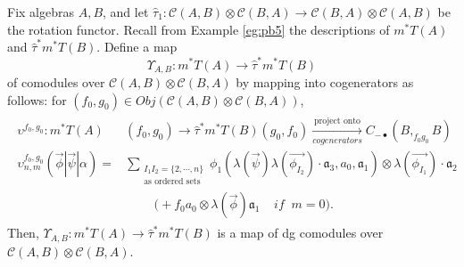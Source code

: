 \begin{prop}
\label{prop:c1}
Fix algebras $A,B$, and let 
$\hat{\tau}_1: \mathcal{C}(A,B) \otimes 
\mathcal{C}(B,A) \to \mathcal{C}(B,A) \otimes 
\mathcal{C}(A,B)$ be the rotation functor.
Recall from Example \ref{eg:pb5} 
the descriptions of $m^*T(A)$ and 
$\hat{\tau}^*m^*T(B)$. Define a map 
$$
\Upsilon_{A,B}: m^*T(A)
\to \hat{\tau}^*m^*T(B)
$$
of comodules over 
$\mathcal{C}(A,B) \otimes 
\mathcal{C}(B,A)$ by mapping into 
cogenerators as follows: for 
$(f_0,g_0) \in Obj(\mathcal{C}(A,B) \otimes 
\mathcal{C}(B,A))$,
\begin{align}\label{eq:define_upsilon}
\begin{split}
\upsilon^{f_0, g_0}: 
m^*T(A)
&(f_0, g_0)
\to \hat{\tau}^*m^*T(B)(g_0, f_0)
\xrightarrow[cogenerators]{\textrm{project onto}}
C_{-\bullet}(B, _{f_0g_0}B)\\
\upsilon_{n,m}^{f_0,g_0} 
(\vec{\phi} | \vec{\psi} | \alpha) = 
& \sum_{\substack{I_1I_2 = \{2,\cdots,n\} \\
                          \textrm{as ordered sets}}}
  \phi_1(\lambda(\vec{\psi})\lambda(\vec{\phi_{I_2}})\cdot \mathfrak{a}_3, a_0, \mathfrak{a}_1) \otimes \lambda(\vec{\phi_{I_1}}) \cdot \mathfrak{a}_2 \\
&\phantom{{}move{}}
\bigg( + f_0a_0 \otimes \lambda(\vec{\phi}) \mathfrak{a}_1 
  \; \; \; \; if \; \; m = 0 \bigg).
\end{split}
\end{align}
Then, $\Upsilon_{A,B}: m^*T(A)
\to \hat{\tau}^*m^*T(B)$ 
is a map of dg comodules over 
$\mathcal{C}(A,B) \otimes 
\mathcal{C}(B,A)$.
\end{prop}
%
